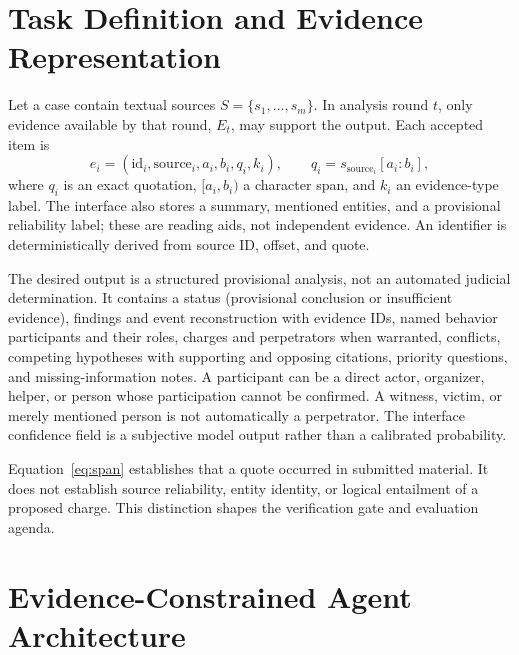\documentclass[10pt,a4paper]{article}
\begin{document}
\section{Task Definition and Evidence Representation}
Let a case contain textual sources $S=\{s_1,\ldots,s_m\}$. In analysis round $t$, only evidence available by that round, $E_t$, may support the output. Each accepted item is
\begin{equation}
e_i=(\mathrm{id}_i,\mathrm{source}_i,a_i,b_i,q_i,k_i),\qquad
q_i=s_{\mathrm{source}_i}[a_i:b_i],
\label{eq:span}
\end{equation}
where $q_i$ is an exact quotation, $[a_i,b_i)$ a character span, and $k_i$ an evidence-type label. The interface also stores a summary, mentioned entities, and a provisional reliability label; these are reading aids, not independent evidence. An identifier is deterministically derived from source ID, offset, and quote.

The desired output is a structured provisional analysis, not an automated judicial determination. It contains a status (provisional conclusion or insufficient evidence), findings and event reconstruction with evidence IDs, named behavior participants and their roles, charges and perpetrators when warranted, conflicts, competing hypotheses with supporting and opposing citations, priority questions, and missing-information notes. A participant can be a direct actor, organizer, helper, or person whose participation cannot be confirmed. A witness, victim, or merely mentioned person is not automatically a perpetrator. The interface confidence field is a subjective model output rather than a calibrated probability.

Equation~\eqref{eq:span} establishes that a quote occurred in submitted material. It does not establish source reliability, entity identity, or logical entailment of a proposed charge. This distinction shapes the verification gate and evaluation agenda.

\section{Evidence-Constrained Agent Architecture}
\begin{center}
\centering
{}
\label{fig:architecture}
\end{center}
\end{document}
